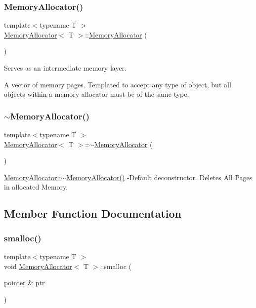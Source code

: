 \subsubsection{\texorpdfstring{Memory\+Allocator()}{MemoryAllocator()}}
{\footnotesize\ttfamily template$<$typename T $>$ \\
\hyperlink{class_memory_allocator}{Memory\+Allocator}$<$ T $>$\+::\hyperlink{class_memory_allocator}{Memory\+Allocator} (\begin{DoxyParamCaption}{ }\end{DoxyParamCaption})}

Serves as an intermediate memory layer.

A vector of memory pages. Templated to accept any type of object, but all objects within a memory allocator must be of the same type. \mbox{\label{class_memory_allocator_a06ba8aa77baa4fea0096da7f0c720e7b}} 
\subsubsection{\texorpdfstring{$\sim$\+Memory\+Allocator()}{~MemoryAllocator()}}
{\footnotesize\ttfamily template$<$typename T $>$ \\
\hyperlink{class_memory_allocator}{Memory\+Allocator}$<$ T $>$\+::$\sim$\hyperlink{class_memory_allocator}{Memory\+Allocator} (\begin{DoxyParamCaption}{ }\end{DoxyParamCaption})}

\hyperlink{class_memory_allocator_a06ba8aa77baa4fea0096da7f0c720e7b}{Memory\+Allocator\+::$\sim$\+Memory\+Allocator()} -\/\+Default deconstructor. Deletes All Pages in allocated Memory. 

\subsection{Member Function Documentation}
\mbox{\label{class_memory_allocator_a0afd80ad46c6631bc7986d8a3fe36f3c}} 
\subsubsection{\texorpdfstring{smalloc()}{smalloc()}\hspace{0.1cm}{\footnotesize\ttfamily [1/2]}}
{\footnotesize\ttfamily template$<$typename T $>$ \\
void \hyperlink{class_memory_allocator}{Memory\+Allocator}$<$ T $>$\+::smalloc (\begin{DoxyParamCaption}\item[{\hyperlink{structpointer}{pointer} \&}]{ptr }\end{DoxyParamCaption})}

